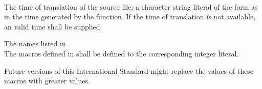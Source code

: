 \begin{description}
\item
{}%
\\
The time of translation of the source file:
a character string literal of the form
as in the time generated by the
function.
If the time of translation is not available,
an  valid time shall be supplied.

\item The names listed in .\\
The macros defined in  shall be defined to
the corresponding integer literal.
\begin{note}
Future versions of this International Standard might replace
the values of these macros with greater values.
\end{note}
\end{description}


